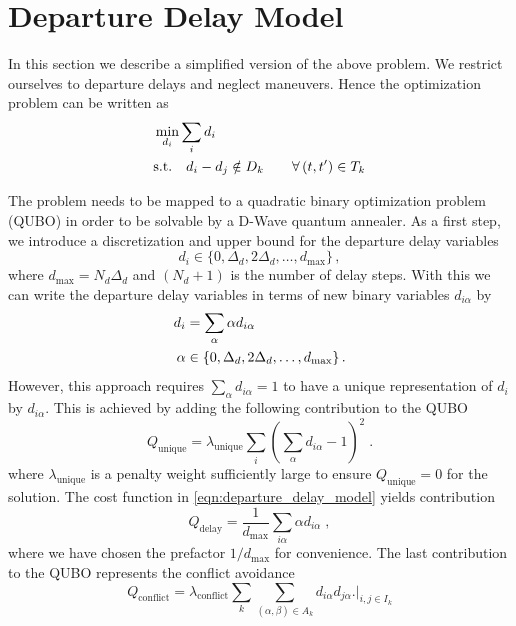 \documentclass[aps,pra,twocolumn,10pt]{revtex4-1}
\begin{document}
\section{Departure Delay Model}
\label{sec:departure_delay_model}
In this section we describe a simplified version of the above problem.
We restrict ourselves to departure delays and neglect maneuvers.
Hence the optimization problem can be written as
\begin{align}
    & \min_{d_i} \sum_i d_i \notag \\
    & \text{s.t.}  \quad 
    d_i - d_j \notin D_k \qquad \forall \, (t, t') \in T_k \label{eqn:departure_delay_model}
\end{align}

The problem needs to be mapped to a quadratic binary optimization problem (QUBO) in order to be solvable by a D-Wave quantum annealer.
As a first step, we introduce a discretization and upper bound for the departure delay variables 
\begin{equation*}
    d_i \in \{0, \Delta_d, 2\Delta_d, \dots, d_\text{max} \}\, ,
\end{equation*}
where $d_\text{max} = N_d \Delta_d$ and $(N_d + 1)$ is the number of delay steps.
With this we can write the departure delay variables in terms of new binary variables $d_{i\alpha}$ by
\begin{align}
    d_i & = \sum_\alpha \alpha d_{i\alpha} \notag \\
    \alpha & \in \{0, \Delta_d, 2\Delta_d, \dots, d_\text{max} \}\, . \label{eqn:departure_delay_model_discretization}
\end{align}
However, this approach requires $\sum_\alpha d_{i\alpha} = 1$ to have a unique representation of $d_i$ by $d_{i\alpha}$.
This is achieved by adding the following contribution to the QUBO
\begin{equation*}
    Q_\text{unique} = \lambda_\text{unique} \sum_i \left( \sum_\alpha d_{i\alpha} - 1 \right)^2 \; .
\end{equation*}
where $\lambda_\text{unique}$ is a penalty weight sufficiently large to ensure $Q_\text{unique}=0$ for the solution.
The cost function in \eqref{eqn:departure_delay_model} yields contribution
\begin{equation*}
    Q_\text{delay} = \frac{1}{d_\text{max}}\sum_{i\alpha} \alpha d_{i\alpha} \; ,
\end{equation*}
where we have chosen the prefactor $1/d_\text{max}$ for convenience.
The last contribution to the QUBO represents the conflict avoidance
\begin{equation*}
    Q_\text{conflict} = \lambda_\text{conflict} \sum_k \sum_{(\alpha, \beta) \in A_k} d_{i\alpha} d_{j\alpha} \biggl. \biggr|_{i, j \in I_k}
\end{equation*}
\end{document}
